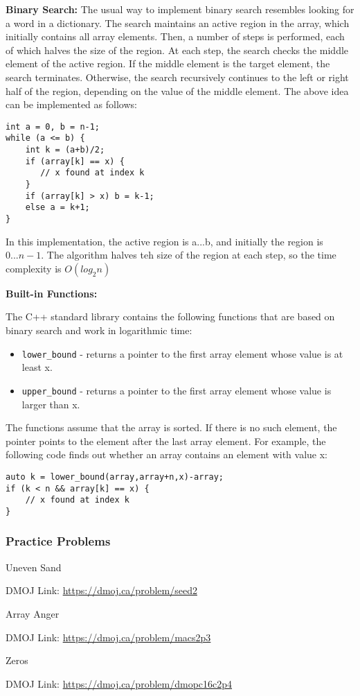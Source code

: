 \documentclass{report}
\newcommand{\problem}[2]{
    \begin{problembox}
        #1
        
        DMOJ Link: \href{#2}{#2}
    \end{problembox}
}
\begin{document}
\textbf{Binary Search: }
The usual way to implement binary search resembles looking for a word in a dictionary. The search maintains an active region in the array, which initially contains all array elements. Then, a number of steps is performed, each of which halves the size of the region. \newline
At each step, the search checks the middle element of the active region. If the middle element is the target element, the search terminates. Otherwise, the search recursively continues to the left or right half of the region, depending on the value of the middle element.
The above idea can be implemented as follows:

\begin{lstlisting}[caption=Binary Search]
int a = 0, b = n-1;
while (a <= b) {
    int k = (a+b)/2;
    if (array[k] == x) {
       // x found at index k
    }
    if (array[k] > x) b = k-1;
    else a = k+1;
}
\end{lstlisting}

In this implementation, the active region is a...b, and initially the region is $0... {n - 1}$. The algorithm halves teh size of the region at each step, so the time complexity is $O(log_2n)$

\textbf{Built-in Functions: }

The C++ standard library contains the following functions that are based on binary search and work in logarithmic time:

\begin{itemize}
    \item \lstinline{lower_bound} - returns a pointer to the first array element whose value is at least x.
    \item \lstinline{upper_bound} - returns a pointer to the first array element whose value is larger than x.
\end{itemize}

The functions assume that the array is sorted. If there is no such element,
the pointer points to the element after the last array element. For example, the
following code finds out whether an array contains an element with value x:

\begin{lstlisting}[caption=Binary Search using Built-in function]
auto k = lower_bound(array,array+n,x)-array;
if (k < n && array[k] == x) {
    // x found at index k
}
\end{lstlisting}

\subsubsection{Practice Problems}
\problem{Uneven Sand}{https://dmoj.ca/problem/seed2}
\problem{Array Anger}{https://dmoj.ca/problem/macs2p3}
\problem{Zeros}{https://dmoj.ca/problem/dmopc16c2p4}
\end{document}
